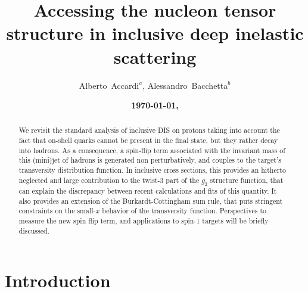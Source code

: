 \documentclass[preprintnumbers,floatfix,nofootinbib]{revtex4}
\begin{document}


\title{Accessing the nucleon tensor structure in inclusive deep inelastic scattering} 

\author{Alberto~Accardi$^{a}$, Alessandro~Bacchetta$^{b}$} 

\date{\bf \today, \currenttime}

\begin{abstract}
We revisit the standard analysis of inclusive DIS on protons taking into account the fact that on-shell quarks cannot be present in the final state, but they rather decay into hadrons. As a consequence, a spin-flip term associated with the invariant mass of this (mini)jet of hadrons is generated non perturbatively, and couples to the target's transversity distribution function. In inclusive cross sections, this provides an hitherto neglected and large contribution to the twist-3 part of the $g_2$ structure function, that can explain the discrepancy between recent calculations and fits of this quantity. It also provides an extension of the Burkardt-Cottingham sum rule, that puts stringent constraints on the small-$x$ behavior of the transversity function. Perspectives to measure the new spin flip term, and applications to spin-1 targets will be briefly discussed.
\end{abstract}



\maketitle


\section{Introduction}
\end{document}
